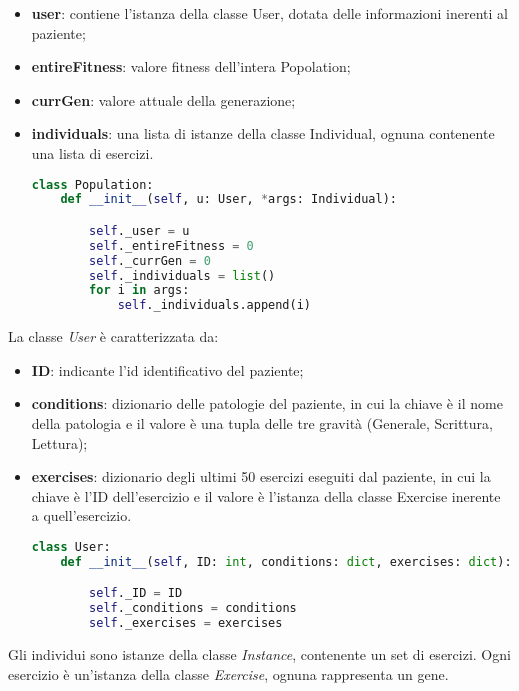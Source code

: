 \documentclass{article}
\begin{document}
\begin{itemize}

\item\textbf{user}: contiene l'istanza della classe User, dotata delle informazioni inerenti al paziente;

\item\textbf{entireFitness}: valore fitness dell'intera Popolation;

\item\textbf{currGen}: valore attuale della generazione;

\item\textbf{individuals}: una lista di istanze della classe Individual, ognuna contenente una lista di esercizi.



\begin{lstlisting}[language = Python]
    class Population:
    def __init__(self, u: User, *args: Individual):

        self._user = u
        self._entireFitness = 0
        self._currGen = 0
        self._individuals = list()
        for i in args:
            self._individuals.append(i)
\end{lstlisting}
\end{itemize}

\bigskip

La classe \textit{User} è caratterizzata da:
\begin{itemize}
\item\textbf{ID}: indicante l'id identificativo del paziente;
\item\textbf{conditions}: dizionario delle patologie del paziente, in cui la chiave è il nome della patologia e il valore è una tupla delle tre gravità (Generale, Scrittura, Lettura);
\item\textbf{exercises}: dizionario degli ultimi 50 esercizi eseguiti dal paziente, in cui la chiave è l'ID dell'esercizio e il valore è l'istanza della classe Exercise inerente a quell'esercizio.
\begin{lstlisting}[language = Python]
    class User:
    def __init__(self, ID: int, conditions: dict, exercises: dict):

        self._ID = ID
        self._conditions = conditions
        self._exercises = exercises
\end{lstlisting}
\end{itemize}
\pagebreak


Gli individui sono istanze della classe \textit{Instance}, contenente un set di esercizi. Ogni esercizio è un'istanza della classe \textit{Exercise}, ognuna rappresenta un gene.
\end{document}
